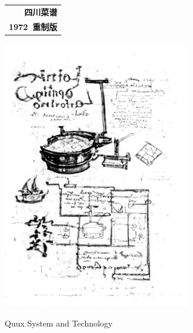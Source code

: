\null%
\vspace{.75\baselineskip}
\begin{center}
\begin{tabular}{r}
	{\Huge\bfseries 四川菜谱}\\
	{\normalsize\bfseries 1972~重制版}%
\end{tabular}

\vfill

\includegraphics[height=118.125mm]{cooking-machine.png}%

\vfill

{\footnotesize Quux System and Technology}
\end{center}
\vspace{.75\baselineskip}

